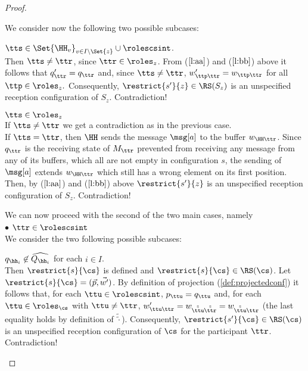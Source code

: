 \begin{proof}
\begin{description}
We consider now the following two possible subcases:
\begin{description}
\item
 $\tts \in\Set{\HH_v}_{v\in I\setminus\Set{z}}\cup\rolescsint$.  \\
Then $\tts \neq \ttr$, since $\ttr \in \roles_z$.
From ($\ref{l:aa}$) and ($\ref{l:bb}$) above it follows that  $q'_\ttr = {q}_\ttr$
and, since  $\tts \neq \ttr$, $w'_{\ttp\ttr} = {w}_{\ttp\ttr}$ for all $\ttp \in \roles_z.$ Consequently, $\restrict{s'}{z} \in \RS(S_z)$ is an unspecified reception configuration of $S_z$. Contradiction!
\item
$\tts \in \roles_z$\\
If $\tts \neq \ttr$ we get a contradiction as in the previous case.\\
If $\tts = \ttr$, then $\HH$ sends the message $\msg[a]$ to the buffer $w_{\HH\ttr}$. Since $q_\ttr$ is the receiving state of $M_\ttr$ prevented from receiving any message from any of its buffers, which all are not empty in configuration $s$, the sending of $\msg[a]$ extends $w_{\HH\ttr}$ which still has a wrong element on its first position. Then, by ($\ref{l:aa}$) and ($\ref{l:bb}$) above $\restrict{s'}{z}$ is an unspecified reception configuration of $S_z$.  Contradiction!
\end{description}
\end{description}
We can now proceed with the second of the two main cases, namely\\[2mm]
$\bullet$ $\ttr \in\rolescsint$\\
We consider the two following possible subcases:
\begin{description}
\item
$q_{\hh_i}\not\in\widehat{Q_{\hh_i}}$ for each $i\in I$.\\
Then $\restrict{s}{\cs}$ is defined and $\restrict{s}{\cs} \in \RS(\cs)$. 
Let $\restrict{s}{\cs} = (\vec{p},\vec{w'})$.
By definition of projection (\cref{def:projectedconf}) it follows that, for each $\ttu\in\rolescsint$,
$p_{\ttu} = q_{\ttu}$ and, for each $\ttu\in\roles_{\cs}$ with $\ttu\neq\ttr$,   $w'_{\ttu\ttr} = w_{\tilde{\tilde{\ttu}}\tilde{\tilde{\ttr}}}= w_{\tilde{\tilde{\ttu}}\ttr}$ (the last equality holds by definition of $\widetilde{\widetilde{\cdot}}$). Consequently, $\restrict{s'}{\cs} \in \RS(\cs)$ is an unspecified reception configuration of $\cs$ for the participant $\ttr$. Contradiction!
\item


\end{description}
\end{proof}
